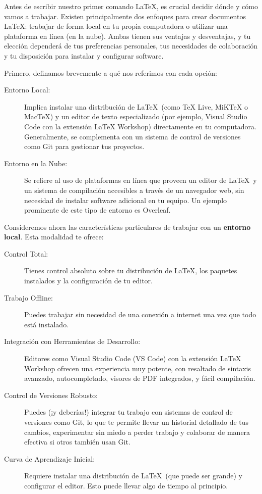 Antes de escribir nuestro primer comando \LaTeX, es crucial decidir dónde y cómo vamos a trabajar.
Existen principalmente dos enfoques para crear documentos \LaTeX: trabajar de forma local en tu propia computadora o utilizar una plataforma en línea (en la nube).
Ambas tienen sus ventajas y desventajas, y tu elección dependerá de tus preferencias personales, tus necesidades de colaboración y tu disposición para instalar y configurar software.

Primero, definamos brevemente a qué nos referimos con cada opción:
\begin{description}
  \item[Entorno Local:] Implica instalar una distribución de \LaTeX\ (como TeX Live, MiKTeX o MacTeX) y un editor de texto especializado (por ejemplo, Visual Studio Code con la extensión LaTeX Workshop) directamente en tu computadora.
        Generalmente, se complementa con un sistema de control de versiones como Git para gestionar tus proyectos.
  \item[Entorno en la Nube:] Se refiere al uso de plataformas en línea que proveen un editor de \LaTeX\ y un sistema de compilación accesibles a través de un navegador web, sin necesidad de instalar software adicional en tu equipo.
        Un ejemplo prominente de este tipo de entorno es Overleaf.
\end{description}

Consideremos ahora las características particulares de trabajar con un \textbf{entorno local}.
Esta modalidad te ofrece:
\begin{description}
  \item[Control Total:] Tienes control absoluto sobre tu distribución de \LaTeX, los paquetes instalados y la configuración de tu editor.
  \item[Trabajo Offline:] Puedes trabajar sin necesidad de una conexión a internet una vez que todo está instalado.
  \item[Integración con Herramientas de Desarrollo:] Editores como Visual Studio Code (VS Code) con la extensión LaTeX Workshop ofrecen una experiencia muy potente, con resaltado de sintaxis avanzado, autocompletado, visores de PDF integrados, y fácil compilación.
  \item[Control de Versiones Robusto:] Puedes (¡y deberías!) integrar tu trabajo con sistemas de control de versiones como Git, lo que te permite llevar un historial detallado de tus cambios, experimentar sin miedo a perder trabajo y colaborar de manera efectiva si otros también usan Git.
  \item[Curva de Aprendizaje Inicial:] Requiere instalar una distribución de \LaTeX\ (que puede ser grande) y configurar el editor.
        Esto puede llevar algo de tiempo al principio.
\end{description}

